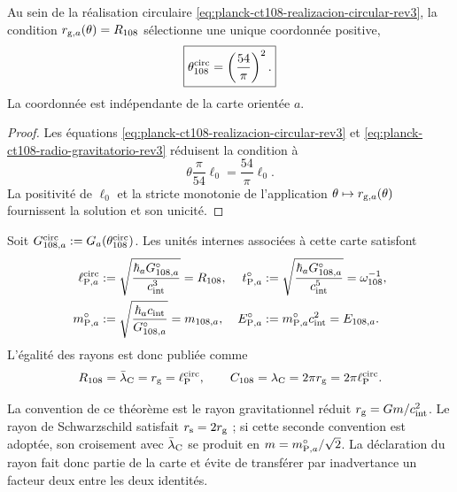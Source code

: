 \begin{proposition}
\label{prop:selector-circular-planck-ct108-rev3}
Au sein de la réalisation circulaire
\eqref{eq:planck-ct108-realizacion-circular-rev3}, la condition
\(r_{{\rm g},a}(\theta)=R_{108}\) sélectionne une unique coordonnée
positive,
\begin{equation}
 \boxed{\theta_{108}^{\rm circ}=\left(\frac{54}{\pi}\right)^2.}
 \label{eq:theta-circular-planck-ct108-rev3}
\end{equation}
La coordonnée est indépendante de la carte orientée \(a\).
\end{proposition}

\begin{proof}
Les équations
\eqref{eq:planck-ct108-realizacion-circular-rev3} et
\eqref{eq:planck-ct108-radio-gravitatorio-rev3} réduisent la condition à
\[
 \theta\frac{\pi}{54}\ell_0=\frac{54}{\pi}\ell_0.
\]
La positivité de \(\ell_0\) et la stricte monotonie de l’application
\(\theta\mapsto r_{{\rm g},a}(\theta)\) fournissent la solution et son
unicité.
\end{proof}

Soit \(G_{108,a}^{\rm circ}:=G_a(\theta_{108}^{\rm circ})\). Les unités internes
associées à cette carte satisfont
\begin{align}
 \ell_{{\rm P},a}^{\rm circ}
 &:=\sqrt{\frac{\hbar_a G_{108,a}^{\circ}}{c_{\rm int}^{3}}}
 =R_{108},
 &
 t_{{\rm P},a}^{\circ}
 &:=\sqrt{\frac{\hbar_a G_{108,a}^{\circ}}{c_{\rm int}^{5}}}
 =\omega_{108}^{-1},
 \label{eq:planck-ct108-longitud-tiempo-rev3}\\
 m_{{\rm P},a}^{\circ}
 &:=\sqrt{\frac{\hbar_a c_{\rm int}}{G_{108,a}^{\circ}}}
 =m_{108,a},
 &
 E_{{\rm P},a}^{\circ}
 &:=m_{{\rm P},a}^{\circ}c_{\rm int}^{2}=E_{108,a}.
 \label{eq:planck-ct108-masa-energia-rev3}
\end{align}
L’égalité des rayons est donc publiée comme
\begin{equation}
 R_{108}=\bar\lambda_{\rm C}=r_{\rm g}=\ell_{\rm P}^{\rm circ},
 \qquad
 C_{108}=\lambda_{\rm C}=2\pi r_{\rm g}=2\pi\ell_{\rm P}^{\rm circ}.
 \label{eq:planck-ct108-tres-lectores-rev3}
\end{equation}

La convention de ce théorème est le rayon gravitationnel réduit
\(r_{\rm g}=Gm/c_{\rm int}^{2}\). Le rayon de Schwarzschild satisfait
\(r_{\rm s}=2r_{\rm g}\) ; si cette seconde convention est adoptée, son croisement avec
\(\bar\lambda_{\rm C}\) se produit en
\(m=m_{{\rm P},a}^{\circ}/\sqrt2\). La déclaration du rayon fait donc
partie de la carte et évite de transférer par inadvertance un facteur deux
entre les deux identités.

